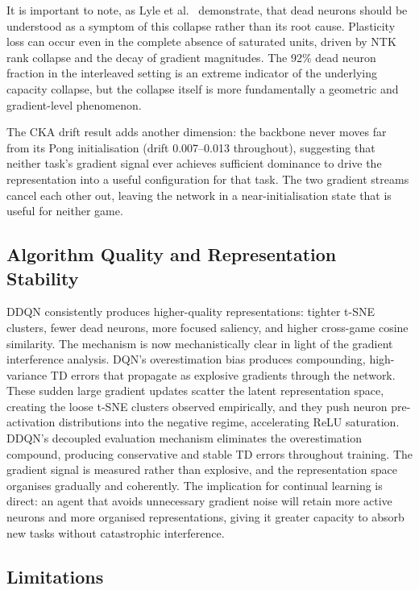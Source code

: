 \documentclass[a4paper]{article}
\begin{document}
It is important to note, as Lyle et al.\ \cite{lyle2023plasticity} demonstrate, that dead
neurons should be understood as a symptom of this collapse rather than its root cause.
Plasticity loss can occur even in the complete absence of saturated units, driven by NTK
rank collapse and the decay of gradient magnitudes. The 92\% dead neuron fraction in the
interleaved setting is an extreme indicator of the underlying capacity collapse, but the
collapse itself is more fundamentally a geometric and gradient-level phenomenon.

The CKA drift result adds another dimension: the backbone never moves far from its Pong
initialisation (drift 0.007--0.013 throughout), suggesting that neither task's gradient
signal ever achieves sufficient dominance to drive the representation into a useful
configuration for that task. The two gradient streams cancel each other out, leaving the
network in a near-initialisation state that is useful for neither game.

\subsection{Algorithm Quality and Representation Stability}

DDQN consistently produces higher-quality representations: tighter t-SNE clusters, fewer
dead neurons, more focused saliency, and higher cross-game cosine similarity. The mechanism
is now mechanistically clear in light of the gradient interference analysis. DQN's
overestimation bias produces compounding, high-variance TD errors that propagate as
explosive gradients through the network. These sudden large gradient updates scatter the
latent representation space, creating the loose t-SNE clusters observed empirically, and
they push neuron pre-activation distributions into the negative regime, accelerating ReLU
saturation. DDQN's decoupled evaluation mechanism eliminates the overestimation compound,
producing conservative and stable TD errors throughout training. The gradient signal is
measured rather than explosive, and the representation space organises gradually and
coherently. The implication for continual learning is direct: an agent that avoids
unnecessary gradient noise will retain more active neurons and more organised representations,
giving it greater capacity to absorb new tasks without catastrophic interference.

\subsection{Limitations}
\end{document}
